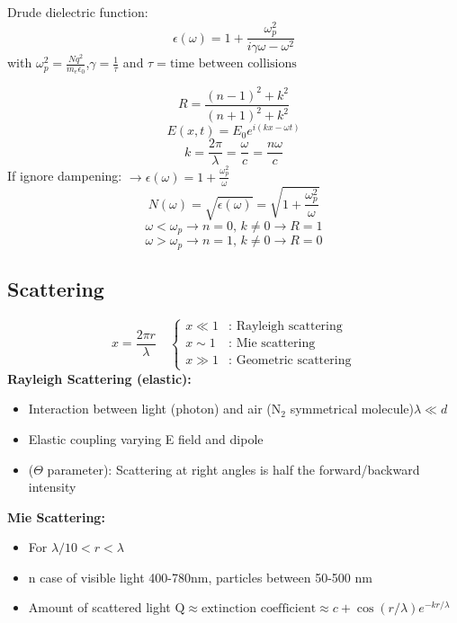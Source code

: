 Drude dielectric function:
\[
\epsilon(\omega) = 1 + \frac{\omega^2_p}{i\gamma \omega-\omega^2}
\]
with \(\omega^2_p = \frac{Nq^2}{m_e\epsilon_0}\),\(\gamma = \frac{1}{\tau}\) and \(\tau = \text{time between collisions}\)

\[
R = \frac{\left(n-1\right)^2 + k^2}{\left(n+1\right)^2 + k^2}
\]
\[
E(x,t) = E_0 e^{i\left(kx - \omega t\right)}
\]
\[
k = \frac{2\pi}{\lambda} = \frac{\omega}{c} = \frac{n\omega}{c}
\]
If ignore dampening: \(\rightarrow \epsilon(\omega) = 1 + \frac{\omega^2_p}{\omega}\)
\[
N(\omega) = \sqrt{\epsilon(\omega)} = \sqrt{1 + \frac{\omega^2_p}{\omega}}
\]
\[
\omega < \omega_p \rightarrow n=0,\,k\neq0 \rightarrow R = 1
\]
\[
\omega > \omega_p \rightarrow n=1,\,k\neq0 \rightarrow R = 0
\]
\subsection{Scattering}
\[
x = \frac{2\pi r}{\lambda}
\quad
\begin{cases}
x \ll 1 & \text{: Rayleigh scattering} \\
x \sim 1 & \text{: Mie scattering} \\
x \gg 1 & \text{: Geometric scattering}
\end{cases}
\]
 \textbf{Rayleigh Scattering (elastic):}
 \begin{itemize}
    \item Interaction between light (photon) and air (\(\text{N}_2\) symmetrical molecule)\(\lambda \ll d\)
    \item Elastic coupling varying E field and dipole
    \item (\(\Theta\) parameter): Scattering at right angles is half the forward/backward intensity
 \end{itemize}
 \textbf{Mie Scattering:}
 \begin{itemize}
    \item For \(\lambda/10 < r < \lambda\)
    \item n case of visible light 400-780nm, particles between 50-500 nm
    \item Amount of scattered light \(\text{Q} \approx \text{extinction coefficient}\approx c+\cos(r/\lambda)e^{-kr/\lambda}\)
 \end{itemize}